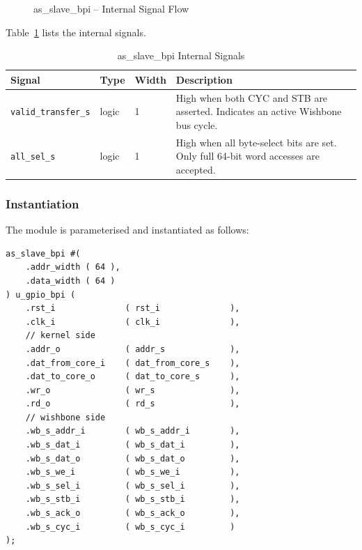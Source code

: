\begin{figure}[H]
\caption{as\_slave\_bpi -- Internal Signal Flow}
\label{fig:asSlaveBpi01}
\end{figure}

Table~\ref{tab:asSlaveBpiInt} lists the internal signals.

\begin{table}[H]
\caption{as\_slave\_bpi Internal Signals}
\label{tab:asSlaveBpiInt}
\centering
\begin{tabularx}{\textwidth}{|l |l |l |X|}
  \hline
  Signal & Type & Width & Description \\
  \hline
  \hline
  \texttt{valid\_transfer\_s} & logic & 1 & High when both CYC and STB are asserted.
    Indicates an active Wishbone bus cycle. \\
  \hline
  \texttt{all\_sel\_s}        & logic & 1 & High when all byte-select bits are set.
    Only full 64-bit word accesses are accepted. \\
  \hline
\end{tabularx}
\end{table}

\subsubsection{Instantiation}

The module is parameterised and instantiated as follows:

\begin{verbatim}
as_slave_bpi #(
    .addr_width ( 64 ),
    .data_width ( 64 )
) u_gpio_bpi (
    .rst_i              ( rst_i              ),
    .clk_i              ( clk_i              ),
    // kernel side
    .addr_o             ( addr_s             ),
    .dat_from_core_i    ( dat_from_core_s    ),
    .dat_to_core_o      ( dat_to_core_s      ),
    .wr_o               ( wr_s               ),
    .rd_o               ( rd_s               ),
    // wishbone side
    .wb_s_addr_i        ( wb_s_addr_i        ),
    .wb_s_dat_i         ( wb_s_dat_i         ),
    .wb_s_dat_o         ( wb_s_dat_o         ),
    .wb_s_we_i          ( wb_s_we_i          ),
    .wb_s_sel_i         ( wb_s_sel_i         ),
    .wb_s_stb_i         ( wb_s_stb_i         ),
    .wb_s_ack_o         ( wb_s_ack_o         ),
    .wb_s_cyc_i         ( wb_s_cyc_i         )
);
\end{verbatim}

